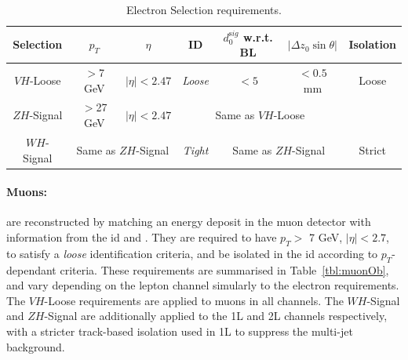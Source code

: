 \begin{table}[!htbp]
  \begin{center}
      \begin{tabular}{ccccccc} \hline \hline
        Selection & $p_T$ & $\eta$ & ID & $d_{0}^{\mathrm sig}$ w.r.t. BL &  $|\Delta{z_{0}}\sin\theta|$ & Isolation \\ \hline
        $VH$-Loose & $>$7 GeV & $|\eta|< 2.47$ & \textit{Loose} & $ <5$ & $<0.5$ mm & Loose \\ %
        $ZH$-Signal & $>$27 GeV & $|\eta|< 2.47$ & \multicolumn{3}{c}{Same as $VH$-Loose} \\
        $WH$-Signal & \multicolumn{2}{c}{Same as $ZH$-Signal} & \textit{Tight} & \multicolumn{2}{c}{Same as $ZH$-Signal} & Strict \\ %
        \hline\hline
      \end{tabular}
    \caption{Electron Selection requirements.} %
    \label{tbl:elOb}
  \end{center}
\end{table}

\paragraph{Muons:} are reconstructed by matching an energy deposit in the muon detector with information from the \gls{id} and  \cite{Aad:2746302}. They are required to have $p_T >$ 7 GeV, $|\eta| < 2.7$, to satisfy a \textit{loose} identification criteria, and be isolated in the \gls{id} according to $p_T$-dependant criteria. These requirements are summarised in Table~\ref{tbl:muonOb}, and vary depending on the lepton channel simularly to the electron requirements. The $VH$-Loose requirements are applied to muons in all channels. The $WH$-Signal and $ZH$-Signal are additionally applied to the 1L and 2L channels respectively, with a stricter track-based isolation used in 1L to suppress the multi-jet background.

